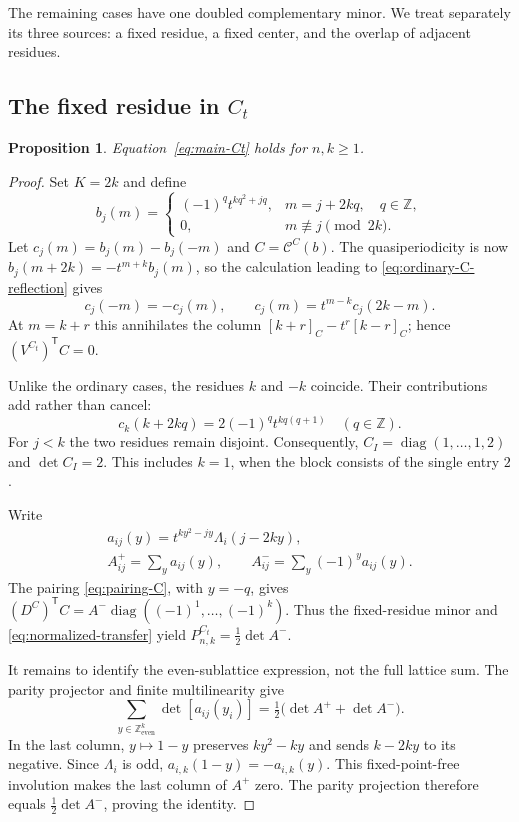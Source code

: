 \documentclass[12pt]{article}
\newtheorem{proposition}[theorem]{Proposition}
\numberwithin{equation}{section}
\newcommand{\Z}{\mathbb Z}
\newcommand{\diag}{\operatorname{diag}}
\newcommand{\latticeeven}{\Z_{\mathrm{even}}^k}
\begin{document}
The remaining cases have one doubled complementary minor.  We treat
separately its three sources: a fixed residue, a fixed center, and the
overlap of adjacent residues.

\subsection{The fixed residue in \texorpdfstring{$C_t$}{Ct}}

\begin{proposition}
Equation~\eqref{eq:main-Ct} holds for $n,k\ge1$.
\end{proposition}

\begin{proof}
Set $K=2k$ and define
\[
 b_j(m)=
 \begin{cases}
 (-1)^q t^{kq^2+jq},&m=j+2kq,\quad q\in\Z,\\
 0,&m\not\equiv j\pmod{2k}.
 \end{cases}
\]
Let $c_j(m)=b_j(m)-b_j(-m)$ and $C=\mathcal C^C(b)$.
The quasiperiodicity is now
$b_j(m+2k)=-t^{m+k}b_j(m)$, so the calculation leading to
\eqref{eq:ordinary-C-reflection} gives
\[
 c_j(-m)=-c_j(m),\qquad
 c_j(m)=t^{m-k}c_j(2k-m).
\]
At $m=k+r$ this annihilates the column
$[k+r]_C-t^r[k-r]_C$; hence $(V^{C_t})^{\mathsf T}C=0$.

Unlike the ordinary cases, the residues $k$ and $-k$ coincide.
Their contributions add rather than cancel:
\[
 c_k(k+2kq)=2(-1)^qt^{kq(q+1)}\quad(q\in\Z).
\]
For $j<k$ the two residues remain disjoint.  Consequently,
$C_I=\diag(1,\ldots,1,2)$ and $\det C_I=2$.
This includes $k=1$, when the block consists of the single entry $2$.

Write
\[
\begin{gathered}
 a_{ij}(y)=t^{ky^2-jy}\Lambda_i(j-2ky),\\
 A^+_{ij}=\sum_y a_{ij}(y),\qquad
 A^-_{ij}=\sum_y(-1)^y a_{ij}(y).
\end{gathered}
\]
The pairing \eqref{eq:pairing-C}, with $y=-q$, gives
$(D^C)^{\mathsf T}C=A^-\diag((-1)^1,\ldots,(-1)^k)$.
Thus the fixed-residue minor and \eqref{eq:normalized-transfer} yield
$P^{C_t}_{n,k}=\tfrac12\det A^-$.

It remains to identify the even-sublattice expression, not the full
lattice sum.  The parity projector and finite multilinearity give
\[
 \sum_{y\in\latticeeven}\det[a_{ij}(y_i)]
 =\tfrac12\bigl(\det A^++\det A^-\bigr).
\]
In the last column, $y\mapsto1-y$ preserves $ky^2-ky$ and sends
$k-2ky$ to its negative.  Since $\Lambda_i$ is odd,
$a_{i,k}(1-y)=-a_{i,k}(y)$.  This fixed-point-free involution makes
the last column of $A^+$ zero.  The parity projection therefore equals
$\tfrac12\det A^-$, proving the identity.
\end{proof}
\end{document}
